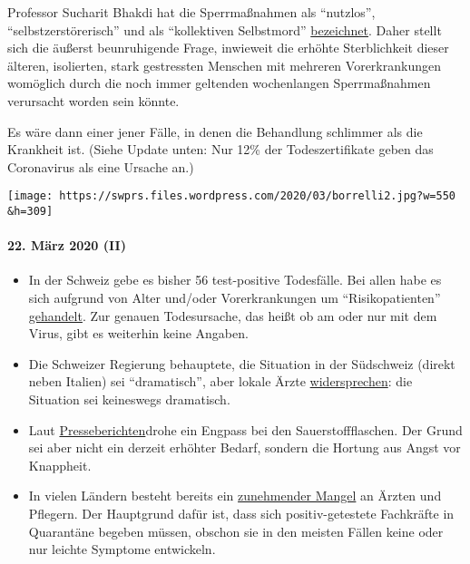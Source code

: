 Professor Sucharit Bhakdi hat die Sperrmaßnahmen als ``nutzlos'',
``selbstzerstörerisch'' und als ``kollektiven Selbstmord''
\href{https://www.youtube.com/watch?v=JBB9bA-gXL4}{bezeichnet}. Daher
stellt sich die äußerst beunruhigende Frage, inwieweit die erhöhte
Sterblichkeit dieser älteren, isolierten, stark gestressten Menschen mit
mehreren Vorerkrankungen womöglich durch die noch immer geltenden
wochenlangen Sperrmaßnahmen verursacht worden sein könnte.

Es wäre dann einer jener Fälle, in denen die Behandlung schlimmer als
die Krankheit ist. (Siehe Update unten: Nur 12\% der Todeszertifikate
geben das Coronavirus als eine Ursache an.)

\texttt{[image: https://swprs.files.wordpress.com/2020/03/borrelli2.jpg?w=550\\\&h=309]}

\hypertarget{22-muxe4rz-2020-ii}{%
\paragraph{22. März 2020 (II)}\label{22-muxe4rz-2020-ii}}

\begin{itemize}
\tightlist
\item
  In der Schweiz gebe es bisher 56 test-positive Todesfälle. Bei allen
  habe es sich aufgrund von Alter und/oder Vorerkrankungen um
  ``Risikopatienten''
  \href{https://www.nzz.ch/schweiz/coronavirus-in-der-schweiz-die-neusten-entwicklungen-ld.1542664\#subtitle-wie-viele-infizierte-und-todesf-lle-gibt-es-second}{gehandelt}.
  Zur genauen Todesursache, das heißt ob am oder nur mit dem Virus, gibt
  es weiterhin keine Angaben.
\item
  Die Schweizer Regierung behauptete, die Situation in der Südschweiz
  (direkt neben Italien) sei ``dramatisch'', aber lokale Ärzte
  \href{https://www.nzz.ch/schweiz/punkto-intensivbetten-sind-wir-im-tessin-besser-ausgeruestet-als-der-rest-der-schweiz-ld.1547728}{widersprechen}:
  die Situation sei keineswegs dramatisch.
\item
  Laut
  \href{https://www.blick.ch/news/schweiz/nicht-nur-beatmungsgeraete-werden-knapp-im-kampf-gegen-corona-es-droht-ein-engpass-beim-sauerstoff-id15808185.html}{Presseberichten}drohe
  ein Engpass bei den Sauerstoffflaschen. Der Grund sei aber nicht ein
  derzeit erhöhter Bedarf, sondern die Hortung aus Angst vor Knappheit.
\item
  In vielen Ländern besteht bereits ein
  \href{https://www.washingtonpost.com/health/covid-19-hits-doctors-nurses-emts-threatening-health-system/2020/03/17/f21147e8-67aa-11ea-b313-df458622c2cc_story.html}{zunehmender
  Mangel} an Ärzten und Pflegern. Der Hauptgrund dafür ist, dass sich
  positiv-getestete Fachkräfte in Quarantäne begeben müssen, obschon sie
  in den meisten Fällen keine oder nur leichte Symptome entwickeln.
\end{itemize}

